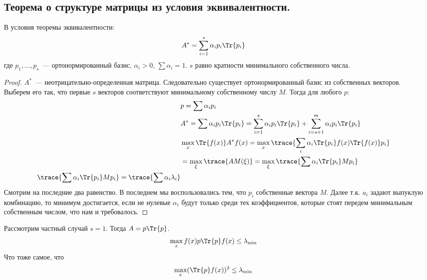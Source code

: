 \subsection{Теорема о структуре матрицы из условия эквивалентности.}
\begin{thm}
В условия теоремы эквивалентности:
$$ A^{*} = \sum \limits_{i=1}^s \alpha_i p_i \Tr{p_i}$$
где $p_1, …, p_s$ —  ортонормированный базис, $\alpha_i >0$, $\sum\alpha_i = 1$. 
$s$ равно кратности минимального собственного числа.
\end{thm}
\begin{proof}
$A^*$ — неотрицательно-определенная матрица. Следовательно существует ортонормированный базис из собственных векторов. Выберем его так, что первые $s$ векторов соответствуют минимальному собственному числу $M$. Тогда для любого $p$:
\begin{equation}
\begin{split}
&p = \sum \alpha_i p_i \\
&A^{*} = \sum \alpha_i p_i \Tr{p_i}  = \sum\limits_{i=1}^{s} \alpha_i p_i \Tr{p_i} + \sum\limits_{i=s+1}^m \alpha_i p_i \Tr{p_i}\\
&\max\limits_x\Tr{f(x)} A^{*} f(x) = \max\limits_{x}\trace{\sum\limits_i  \alpha_i \Tr{p_i} f(x)\Tr{f(x)} p_i} \\
& = \max\limits_{\xi}\trace{A M(\xi)} = \max \limits_{\xi}\trace{\sum \alpha_i \Tr{p_i}Mp_i} \\
\trace{\sum \alpha_i \Tr{p_i}Mp_i} = \trace{\sum \alpha_i \lambda_i}
\end{split}
\end{equation}
Смотрим на последние два равенство. В последнем мы воспользовались тем, что $p_i$ собственные вектора $M$. Далее т.к. $a_i$ задают выпуклую комбинацию, то минимум достигается, если не нулевые $\alpha_i$  будут только среди тех коэффициентов, которые стоят передем минимальным собственным числом, что нам и требовалось.
\end{proof}

\begin{note}
Рассмотрим частный случай $s=1$. Тогда $A = p \Tr{p}$. 
$$\max\limits_{x} f(x) p \Tr{p} f(x) \leq \lambda_{\min}$$
Что тоже самое, что 
$$\max\limits_{x} (\Tr{p}f(x))^2 \leq \lambda_{\min}$$
\end{note}